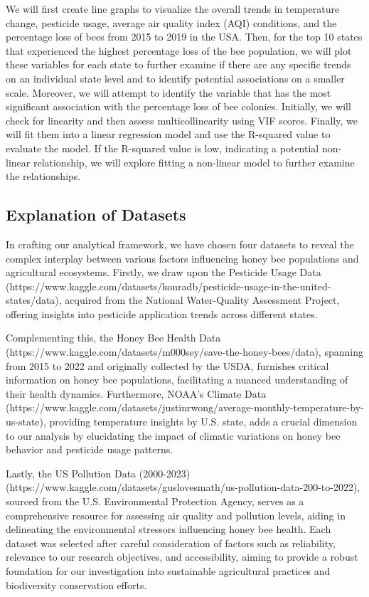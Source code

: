 \documentclass[
  letterpaper,
  DIV=11,
  numbers=noendperiod]{scrartcl}
\begin{document}
We will first create line graphs to visualize the overall trends in
temperature change, pesticide usage, average air quality index (AQI)
conditions, and the percentage loss of bees from 2015 to 2019 in the
USA. Then, for the top 10 states that experienced the highest percentage
loss of the bee population, we will plot these variables for each state
to further examine if there are any specific trends on an individual
state level and to identify potential associations on a smaller scale.
Moreover, we will attempt to identify the variable that has the most
significant association with the percentage loss of bee colonies.
Initially, we will check for linearity and then assess multicollinearity
using VIF scores. Finally, we will fit them into a linear regression
model and use the R-squared value to evaluate the model. If the
R-squared value is low, indicating a potential non-linear relationship,
we will explore fitting a non-linear model to further examine the
relationships.

\subsection{Explanation of Datasets}\label{explanation-of-datasets}

In crafting our analytical framework, we have chosen four datasets to
reveal the complex interplay between various factors influencing honey
bee populations and agricultural ecosystems. Firstly, we draw upon the
Pesticide Usage Data
(https://www.kaggle.com/datasets/konradb/pesticide-usage-in-the-united-states/data),
acquired from the National Water-Quality Assessment Project, offering
insights into pesticide application trends across different states.

Complementing this, the Honey Bee Health Data
(https://www.kaggle.com/datasets/m000sey/save-the-honey-bees/data),
spanning from 2015 to 2022 and originally collected by the USDA,
furnishes critical information on honey bee populations, facilitating a
nuanced understanding of their health dynamics. Furthermore, NOAA's
Climate Data
(https://www.kaggle.com/datasets/justinrwong/average-monthly-temperature-by-us-state),
providing temperature insights by U.S. state, adds a crucial dimension
to our analysis by elucidating the impact of climatic variations on
honey bee behavior and pesticide usage patterns.

Lastly, the US Pollution Data (2000-2023)
(https://www.kaggle.com/datasets/guslovesmath/us-pollution-data-200-to-2022),
sourced from the U.S. Environmental Protection Agency, serves as a
comprehensive resource for assessing air quality and pollution levels,
aiding in delineating the environmental stressors influencing honey bee
health. Each dataset was selected after careful consideration of factors
such as reliability, relevance to our research objectives, and
accessibility, aiming to provide a robust foundation for our
investigation into sustainable agricultural practices and biodiversity
conservation efforts.
\end{document}
